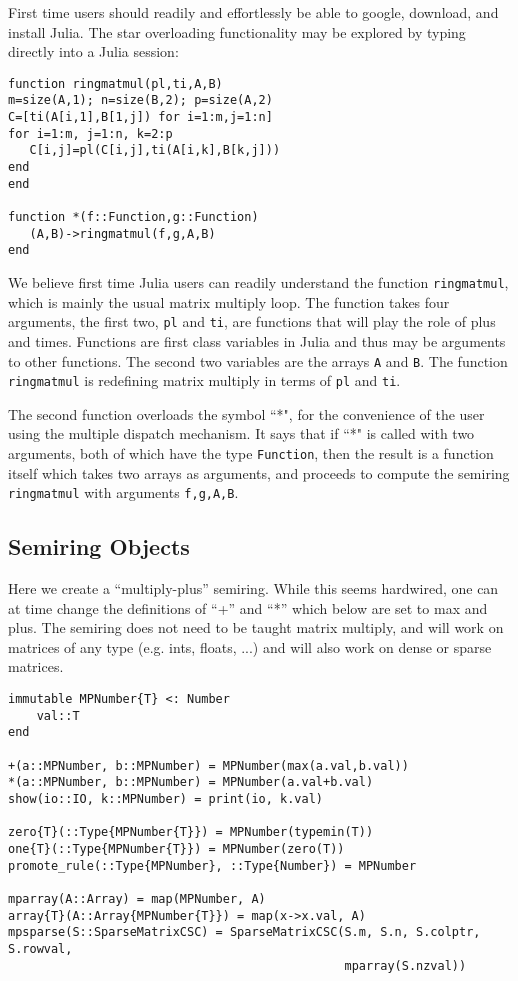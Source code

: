 \documentclass[conference]{IEEEtran}
\begin{document}
First time users should readily and effortlessly be able to google, download, and install Julia.
The star overloading functionality may be explored by typing directly into a Julia session:
\begin{verbatim}
function ringmatmul(pl,ti,A,B)
m=size(A,1); n=size(B,2); p=size(A,2)
C=[ti(A[i,1],B[1,j]) for i=1:m,j=1:n]
for i=1:m, j=1:n, k=2:p
   C[i,j]=pl(C[i,j],ti(A[i,k],B[k,j]))
end    
end      
   
function *(f::Function,g::Function)
   (A,B)->ringmatmul(f,g,A,B)
end
\end{verbatim}

We believe first time Julia users can readily understand the function {\tt ringmatmul}, which is mainly the usual matrix multiply loop.
The function takes four arguments, the first two, {\tt pl} and {\tt ti}, are functions that will play the role of plus and times.  Functions are first class variables in Julia and thus may be arguments to other functions.  The second two variables are the arrays {\tt A} and {\tt B}.
The function {\tt ringmatmul} is redefining matrix multiply in terms of {\tt pl} and {\tt ti}.

The second function overloads the symbol ``*", for the convenience of the user using the multiple dispatch mechanism.  It says that if ``*"  is called with two arguments, both of which have the type {\tt Function}, then the result is a function itself which takes two arrays as arguments, and proceeds to compute the semiring  {\tt ringmatmul} with arguments {\tt f,g,A,B}.


\subsection{Semiring Objects}

Here we create a ``multiply-plus'' semiring.  While this seems hardwired, one
can at time change the definitions of  ``+'' and ``*'' which below are set to 
max and plus.  The semiring does not need to be taught matrix multiply,
and will work on matrices of any type (e.g. ints, floats, ...) and will
also work on dense or sparse matrices.



\begin{verbatim}
immutable MPNumber{T} <: Number
    val::T
end

+(a::MPNumber, b::MPNumber) = MPNumber(max(a.val,b.val))
*(a::MPNumber, b::MPNumber) = MPNumber(a.val+b.val)
show(io::IO, k::MPNumber) = print(io, k.val)

zero{T}(::Type{MPNumber{T}}) = MPNumber(typemin(T))
one{T}(::Type{MPNumber{T}}) = MPNumber(zero(T))
promote_rule(::Type{MPNumber}, ::Type{Number}) = MPNumber

mparray(A::Array) = map(MPNumber, A)
array{T}(A::Array{MPNumber{T}}) = map(x->x.val, A)
mpsparse(S::SparseMatrixCSC) = SparseMatrixCSC(S.m, S.n, S.colptr, S.rowval,
                                               mparray(S.nzval))
\end{verbatim}
\end{document}
